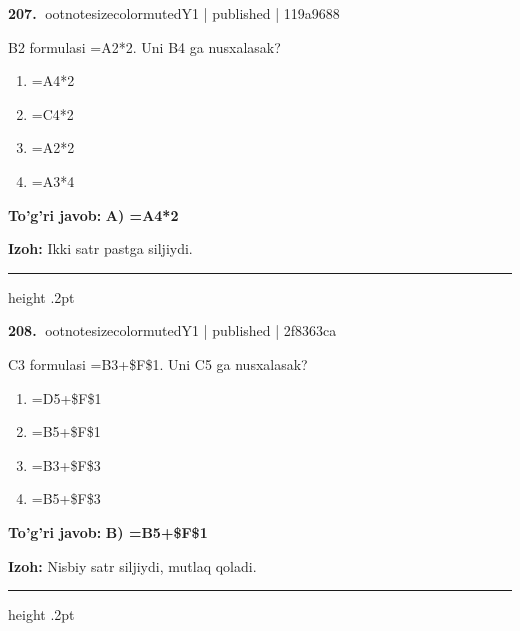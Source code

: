 \documentclass[10pt,a4paper]{article}
\begin{document}
\textbf{\color{ink}207.} {ootnotesizecolor{muted}Y1 | published | 119a9688}
\par
B2 formulasi =A2*2. Uni B4 ga nusxalasak?
\begin{enumerate}[label=\Alph*),leftmargin=9mm]
\item =A4*2
\item =C4*2
\item =A2*2
\item =A3*4
\end{enumerate}
\begin{tcolorbox}[enhanced,breakable,colback=teal!4,colframe=teal!55!black,boxrule=0.45pt,arc=1.2mm,left=2.8mm,right=2.8mm,top=2mm,bottom=2mm]
\textbf{\color{teal}To'g'ri javob:} \textbf{A) =A4*2}
\par\smallskip
\textbf{Izoh:} Ikki satr pastga siljiydi.
\end{tcolorbox}
\vspace{2mm}\hrule height .2pt\vspace{2mm}

\textbf{\color{ink}208.} {ootnotesizecolor{muted}Y1 | published | 2f8363ca}
\par
C3 formulasi =B3+\$F\$1. Uni C5 ga nusxalasak?
\begin{enumerate}[label=\Alph*),leftmargin=9mm]
\item =D5+\$F\$1
\item =B5+\$F\$1
\item =B3+\$F\$3
\item =B5+\$F\$3
\end{enumerate}
\begin{tcolorbox}[enhanced,breakable,colback=teal!4,colframe=teal!55!black,boxrule=0.45pt,arc=1.2mm,left=2.8mm,right=2.8mm,top=2mm,bottom=2mm]
\textbf{\color{teal}To'g'ri javob:} \textbf{B) =B5+\$F\$1}
\par\smallskip
\textbf{Izoh:} Nisbiy satr siljiydi, mutlaq qoladi.
\end{tcolorbox}
\vspace{2mm}\hrule height .2pt\vspace{2mm}
\end{document}
